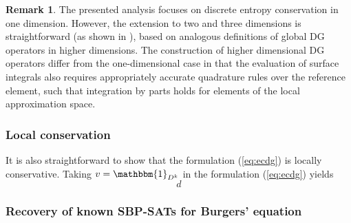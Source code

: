 \documentclass[preprint,10pt]{article}
\theoremstyle{definition}
\theoremstyle{lemma}
\newtheorem*{remark}{Remark}
\theoremstyle{theorem}
\theoremstyle{assumption}
\newcommand{\note}[1]{{\color{blue}{#1}}}
\begin{document}
\begin{remark}
The presented analysis focuses on discrete entropy conservation in one dimension.  However, the extension to two and three dimensions is straightforward (as shown in \cite{chen2017entropy}), based on analogous definitions of global DG operators in higher dimensions.  The construction of higher dimensional DG operators differ from the one-dimensional case in that the evaluation of surface integrals also requires appropriately accurate quadrature rules over the reference element, such that integration by parts holds for elements of the local approximation space.  
\end{remark}

\subsubsection{Local conservation}

It is also straightforward to show that the formulation (\ref{eq:ecdg}) is locally conservative.  Taking $v = \mathbbm{1}_{D^k}$ in the formulation (\ref{eq:ecdg}) yields
\[
d
\]

\note{It holds but with respect to specifically defined fluxes.  Need to use $v = 1$ on $D^k$ and then symmetry of the global DG operator $D^x_h$.  }



\subsubsection{Recovery of known SBP-SATs for Burgers' equation}
\label{sec:recovery}
\end{document}
